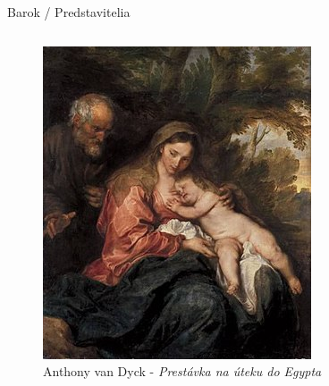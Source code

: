 \documentclass[dvipsnames]{beamer}
\begin{document}
\begin{frame}{\small \textcolor{g}{Barok} / \Large Predstavitelia}
\begin{columns}
		\begin{figure}

			\includegraphics[scale=0.275]{oddych}
			\vskip 1mm
			\caption{\centering \textcolor{BurntOrange}{Anthony van Dyck} - \textit{Prestávka na úteku do Egypta}}
		\end{figure}
	\end{columns}

\end{frame}
\end{document}
